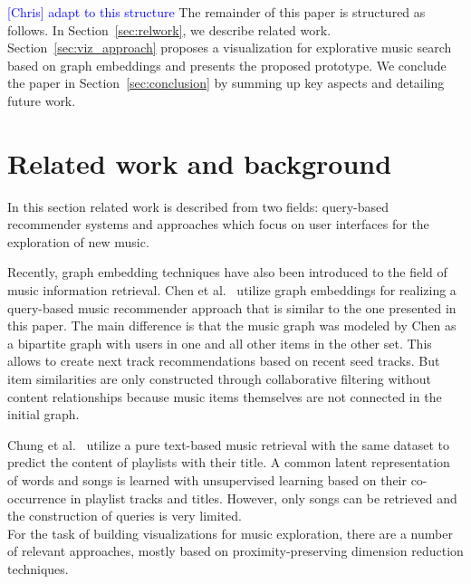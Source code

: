 \documentclass[sigconf]{acmart}
\newcommand{\ce}[1]{\textcolor{blue}{[Chris] #1}}
\newcommand{\ce}[1]{}
\begin{document}
\ce{adapt to this structure}
The remainder of this paper is structured as follows. In Section~\ref{sec:relwork}, we describe related work. Section~\ref{sec:viz_approach} proposes a visualization for explorative music search based on graph embeddings and presents the proposed prototype. We conclude the paper in Section~\ref{sec:conclusion} by summing up key aspects and detailing future work.

\section{Related work and background}

In this section related work is described from two fields: query-based recommender systems and approaches which focus on user interfaces for the exploration of new music. 

Recently, graph embedding techniques have also been introduced to the field of music information retrieval. Chen et al.~\cite{Chen:2016:QMR:2959100.2959169} utilize graph embeddings for realizing a query-based music recommender approach that is similar to the one presented in this paper. The main difference is that the music graph was modeled by Chen as a bipartite graph with users in one and all other items in the other set. This allows to create next track recommendations based on recent seed tracks. But item similarities are only constructed through collaborative filtering without content relationships because music items themselves are not connected in the initial graph. 

Chung et al.~\cite{chungexploiting} utilize a pure text-based music retrieval with the same dataset to predict the content of playlists with their title. A common latent representation of words and songs is learned with unsupervised learning based on their co-occurrence in playlist tracks and titles. However, only songs can be retrieved and the construction of queries is very limited. \\


For the task of building visualizations for music exploration, there are a number of relevant approaches, mostly based on proximity-preserving dimension reduction techniques. 
\end{document}
